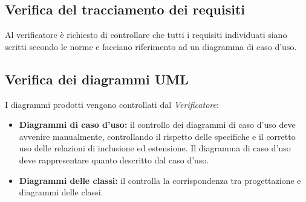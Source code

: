 \subsection{Verifica del tracciamento dei requisiti}
Al verificatore è richiesto di controllare che tutti i requisiti individuati siano scritti secondo le norme e facciano riferimento ad un diagramma di caso d'uso.

\subsection{Verifica dei diagrammi UML}
I diagrammi  prodotti vengono controllati dal \emph{Verificatore}:
	\begin{itemize}
		\item \textbf{Diagrammi di caso d'uso:} il controllo dei diagrammi di caso d'uso deve avvenire manualmente, controllando il rispetto delle specifiche  e il corretto uso delle relazioni di inclusione ed estensione. Il diagramma di caso d'uso deve rappresentare quanto descritto dal caso d'uso.
		\item \textbf{Diagrammi delle classi:} il  controlla la corrispondenza tra progettazione e diagrammi delle classi.
	\end{itemize}


